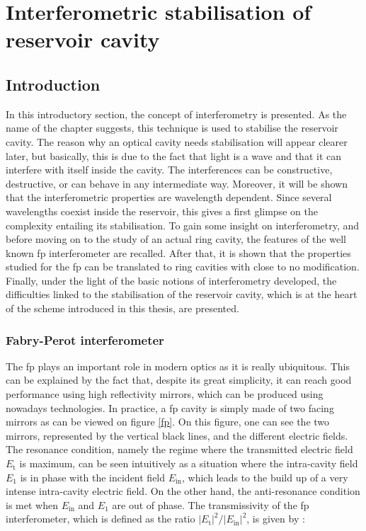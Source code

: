 \chapter{Interferometric stabilisation of reservoir cavity}

\label{ch-stabilisation}


\section{Introduction}

In this introductory section, the concept of interferometry is presented. As the name of the chapter suggests, this technique is used to stabilise the reservoir cavity. The reason why an optical cavity needs stabilisation will appear clearer later, but basically, this is due to the fact that light is a wave and that it can interfere with itself inside the cavity. The interferences can be constructive, destructive, or can behave in any intermediate way. Moreover, it will be shown that the interferometric properties are wavelength dependent. Since several wavelengths coexist inside the reservoir, this gives a first glimpse on the complexity entailing its stabilisation. To gain some insight on interferometry, and before moving on to the study of an actual ring cavity, the features of the well known \gls{fp} interferometer are recalled. After that, it is shown that the properties studied for the \gls{fp} can be translated to ring cavities with close to no modification. Finally, under the light of the basic notions of interferometry developed, the difficulties linked to the stabilisation of the reservoir cavity, which is at the heart of the scheme introduced in this thesis, are presented.


\subsection{Fabry-Perot interferometer}

The \gls{fp} plays an important role in modern optics as it is really ubiquitous. This can be explained by the fact that, despite its great simplicity, it can reach good performance using high reflectivity mirrors, which can be produced using nowadays technologies. In practice, a \gls{fp} cavity is simply made of two facing mirrors as can be viewed on figure \ref{fp}. On this figure, one can see the two mirrors, represented by the vertical black lines, and the different electric fields. The resonance condition, namely the regime where the transmitted electric field $E_{\text{t}}$ is maximum, can be seen intuitively as a situation where the intra-cavity field $E_1$ is in phase with the incident field $E_{\text{in}}$, which leads to the build up of a very intense intra-cavity electric field. On the other hand, the anti-resonance condition is met when $E_{\text{in}}$ and $E_1$ are out of phase. The transmissivity of the \gls{fp} interferometer, which is defined as the ratio $|E_{\text{t}}|^2/|E_{\text{in}}|^2$, is given by \cite{Perot1899}:


